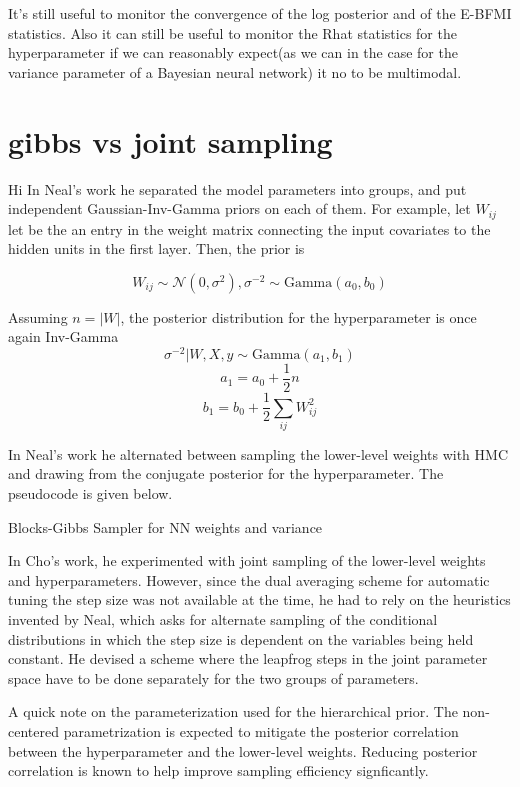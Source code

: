\documentclass[]{report}
\begin{document}
It's still useful to monitor the convergence of the log posterior and of the E-BFMI statistics. Also it can still be useful to monitor the Rhat statistics for the hyperparameter if we can reasonably expect(as we can in the case for the variance parameter of a Bayesian neural network) it no to be multimodal. 



\section{gibbs vs joint sampling}
Hi
In Neal's work he separated the model parameters into groups, and put independent Gaussian-Inv-Gamma priors on each of them. For example, let $W_{ij}$ let be the an entry in the weight matrix connecting the input covariates to the hidden units in the first layer. Then, the prior is 

\[W_{ij} \sim \mathcal{N}(0,\sigma^2), \sigma^{-2} \sim \text{Gamma}(a_0,b_0) \]

Assuming $n = |W|$, the  posterior distribution for the hyperparameter is once again Inv-Gamma
\[\sigma^{-2}|W,X,y \sim \text{Gamma}(a_1,b_1)\]
\[a_1 = a_0 + \frac{1}{2} n  \]
\[b_1 = b_0 + \frac{1}{2} \sum_{ij} W_{ij}^2 \]

In Neal's work he alternated between sampling the lower-level weights with HMC and drawing from the conjugate posterior for the hyperparameter. The pseudocode is given below.
\begin{algorithm}

\caption{Blocks-Gibbs Sampler for NN weights and variance}
\end{algorithm}

In Cho's work, he experimented with joint sampling of the lower-level weights and hyperparameters. However, since the dual averaging scheme for automatic tuning the step size was not available at the time, he had to rely on the heuristics invented by Neal, which asks for alternate sampling of the conditional distributions in which the step size is dependent on the variables being held constant. He devised a scheme where the leapfrog steps in the joint parameter space have to be done separately for the two groups of parameters. 

A quick note on the parameterization used for the hierarchical prior. The non-centered parametrization is expected to mitigate the posterior correlation between the hyperparameter and the lower-level weights. Reducing posterior correlation is known to help improve sampling efficiency signficantly. 
\end{document}
